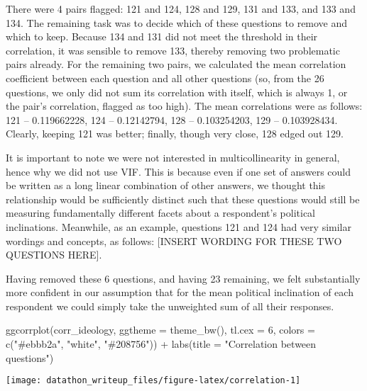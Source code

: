 \documentclass[
]{article}
\newenvironment{Shaded}{\begin{snugshade}}{\end{snugshade}}
\newcommand{\AttributeTok}[1]{\textcolor[rgb]{0.77,0.63,0.00}{#1}}
\newcommand{\DecValTok}[1]{\textcolor[rgb]{0.00,0.00,0.81}{#1}}
\newcommand{\FunctionTok}[1]{\textcolor[rgb]{0.00,0.00,0.00}{#1}}
\newcommand{\NormalTok}[1]{#1}
\newcommand{\SpecialCharTok}[1]{\textcolor[rgb]{0.00,0.00,0.00}{#1}}
\newcommand{\StringTok}[1]{\textcolor[rgb]{0.31,0.60,0.02}{#1}}
\begin{document}
There were 4 pairs flagged: 121 and 124, 128 and 129, 131 and 133, and
133 and 134. The remaining task was to decide which of these questions
to remove and which to keep. Because 134 and 131 did not meet the
threshold in their correlation, it was sensible to remove 133, thereby
removing two problematic pairs already. For the remaining two pairs, we
calculated the mean correlation coefficient between each question and
all other questions (so, from the 26 questions, we only did not sum its
correlation with itself, which is always 1, or the pair's correlation,
flagged as too high). The mean correlations were as follows: 121 --
0.119662228, 124 -- 0.12142794, 128 -- 0.103254203, 129 -- 0.103928434.
Clearly, keeping 121 was better; finally, though very close, 128 edged
out 129.

It is important to note we were not interested in multicollinearity in
general, hence why we did not use VIF. This is because even if one set
of answers could be written as a long linear combination of other
answers, we thought this relationship would be sufficiently distinct
such that these questions would still be measuring fundamentally
different facets about a respondent's political inclinations. Meanwhile,
as an example, questions 121 and 124 had very similar wordings and
concepts, as follows: {[}INSERT WORDING FOR THESE TWO QUESTIONS HERE{]}.

Having removed these 6 questions, and having 23 remaining, we felt
substantially more confident in our assumption that for the mean
political inclination of each respondent we could simply take the
unweighted sum of all their responses.

\begin{Shaded}
\begin{Highlighting}[]
\FunctionTok{ggcorrplot}\NormalTok{(corr\_ideology, }\AttributeTok{ggtheme =} \FunctionTok{theme\_bw}\NormalTok{(), }\AttributeTok{tl.cex =} \DecValTok{6}\NormalTok{,}
           \AttributeTok{colors =} \FunctionTok{c}\NormalTok{(}\StringTok{"\#ebbb2a"}\NormalTok{, }\StringTok{"white"}\NormalTok{, }\StringTok{"\#208756"}\NormalTok{)) }\SpecialCharTok{+}
  \FunctionTok{labs}\NormalTok{(}\AttributeTok{title =} \StringTok{"Correlation between questions"}\NormalTok{)}
\end{Highlighting}
\end{Shaded}

\begin{center}\texttt{[image: datathon\_writeup\_files/figure-latex/correlation-1]} \end{center}
\end{document}
